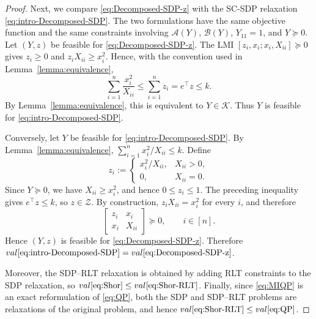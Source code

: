 \documentclass[10pt,a4paper]{amsart}
\def\A{\mathcal{A}}
\def\B{\mathcal{B}}
\def\K{\mathcal{K}}
\begin{document}
\begin{proof}
Next, we compare \eqref{eq:Decomposed-SDP-z} with the SC-SDP relaxation \eqref{eq:intro-Decomposed-SDP}. The two formulations have the same objective function and the same constraints involving $\A(Y)$, $\B(Y)$, $Y_{11}=1$, and $Y\succeq0$. Let $(Y,z)$ be feasible for \eqref{eq:Decomposed-SDP-z}. The LMI $[z_i,x_i;x_i,X_{ii}]\succeq0$ gives $z_i\ge0$ and $z_iX_{ii}\ge x_i^2$. Hence, with the convention used in Lemma~\ref{lemma:equivalence},
\[
\sum_{i=1}^n \frac{x_i^2}{X_{ii}}
\le
\sum_{i=1}^n z_i
=e^\top z
\le k .
\]
By Lemma~\ref{lemma:equivalence}, this is equivalent to $Y\in\K$. Thus $Y$ is feasible for \eqref{eq:intro-Decomposed-SDP}.

Conversely, let $Y$ be feasible for \eqref{eq:intro-Decomposed-SDP}. By Lemma~\ref{lemma:equivalence}, $\sum_{i=1}^n x_i^2/X_{ii}\le k$.
Define
\[
z_i:=
\begin{cases}
x_i^2/X_{ii}, & X_{ii}>0,\\
0, & X_{ii}=0.
\end{cases}
\]
Since $Y\succeq0$, we have $X_{ii}\ge x_i^2$, and hence $0\le z_i\le1$. The preceding inequality gives $e^\top z\le k$, so $z\in\mathcal Z$. By construction, $z_iX_{ii}=x_i^2$ for every $i$, and therefore
\[
\begin{bmatrix}
z_i&x_i\\
x_i&X_{ii}
\end{bmatrix}
\succeq0,\qquad i\in[n].
\]
Hence $(Y,z)$ is feasible for \eqref{eq:Decomposed-SDP-z}. Therefore $\emph{val} \eqref{eq:intro-Decomposed-SDP}=\emph{val} \eqref{eq:Decomposed-SDP-z}$.

Moreover, the SDP--RLT relaxation is obtained by adding RLT constraints to the SDP relaxation, so $\emph{val} \eqref{eq:Shor}\le \emph{val} \eqref{eq:Shor-RLT}$. Finally, since \eqref{eq:MIQP} is an exact reformulation of \eqref{eq:QP}, both the SDP and SDP--RLT problems are relaxations of the original problem, and hence $\emph{val} \eqref{eq:Shor-RLT}\le \emph{val} \eqref{eq:QP}$.
\end{proof}
\end{document}
